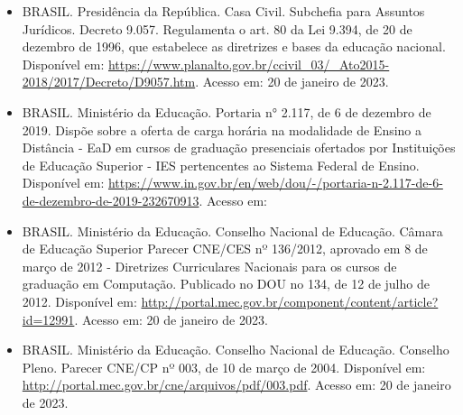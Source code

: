 \begin{itemize}
    \item BRASIL. Presidência da República. Casa Civil. Subchefia para Assuntos
    Jurídicos. Decreto 9.057. Regulamenta o art. 80 da Lei 9.394, de 20 de
    dezembro de 1996, que estabelece as diretrizes e bases da educação
    nacional. 
    Disponível em: \url{https://www.planalto.gov.br/ccivil_03/_Ato2015-2018/2017/Decreto/D9057.htm}.
    Acesso em: 20 de janeiro de 2023.

  \item BRASIL. Ministério da Educação. Portaria n° 2.117, de 6 de
    dezembro de 2019.  Dispõe sobre a oferta de carga horária na
    modalidade de Ensino a Distância - EaD em cursos de graduação
    presenciais ofertados por Instituições de Educação Superior - IES
    pertencentes ao Sistema Federal de Ensino.  Disponível em:
    \href{https://www.in.gov.br/en/web/dou/-/portaria-n-2.117-de-6-de-dezembro-de-2019-232670913}{https://www.in.gov.br/en/web/dou/-/portaria-n-2.117-de-6-de-dezembro-de-2019-232670913}.
    Acesso em:
    
    \item BRASIL. Ministério da Educação. Conselho Nacional de Educação. Câmara
    de Educação Superior Parecer CNE/CES nº 136/2012, aprovado em 8 de março de
    2012 - Diretrizes Curriculares Nacionais para os cursos de graduação em
    Computação. 
    Publicado no DOU no 134, de 12 de julho de 2012.
    Disponível em: \url{http://portal.mec.gov.br/component/content/article?id=12991}.
    Acesso em: 20 de janeiro de 2023.
    
    \item BRASIL. Ministério da Educação. Conselho Nacional de Educação.
    Conselho Pleno. Parecer CNE/CP nº 003, de 10 de março de 2004.
    Disponível em: \url{http://portal.mec.gov.br/cne/arquivos/pdf/003.pdf}. 
    Acesso em: 20 de janeiro de 2023.
    

\end{itemize}
